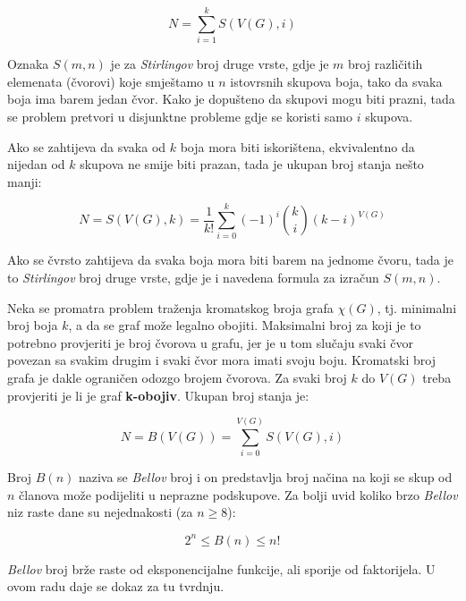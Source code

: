 \documentclass[times, utf8, diplomski, numeric]{fer}
\begin{document}
\begin{equation}
N = \sum_{i=1}^{k} S(V(G), i)
\end{equation}

Oznaka $S(m,n)$ je za \emph{Stirlingov} broj druge vrste, gdje je $m$ broj različitih elemenata (čvorovi) koje smještamo u $n$ istovrsnih skupova boja, tako da svaka boja ima barem jedan čvor. Kako je dopušteno da skupovi mogu biti prazni, tada se problem pretvori u disjunktne probleme gdje se koristi samo $i$ skupova. 

Ako se zahtijeva da svaka od $k$ boja mora biti iskorištena, ekvivalentno da nijedan od $k$ skupova ne smije biti prazan, tada je ukupan broj stanja nešto manji:

\begin{equation}
N = S(V(G), k) = \frac{1}{k!}\sum_{i=0}^{k} (-1)^i \binom{k}{i}(k-i)^{V(G)}  
\end{equation}

Ako se čvrsto zahtijeva da svaka boja mora biti barem na jednome čvoru, tada je to \emph{Stirlingov} broj druge vrste, gdje je i navedena formula za izračun $S(m,n)$.

Neka se promatra problem traženja kromatskog broja grafa $\chi(G)$, tj. minimalni broj boja $k$, a da se graf može legalno obojiti. Maksimalni broj za koji je to potrebno provjeriti je broj čvorova u grafu, jer je u tom slučaju svaki čvor povezan sa svakim drugim i svaki čvor mora imati svoju boju. Kromatski broj grafa je dakle ograničen odozgo brojem čvorova. Za svaki broj $k$ do $V(G)$ treba provjeriti je li je graf \textbf{k-obojiv}. Ukupan broj stanja je:

\begin{equation}
N = B(V(G)) = \sum_{i=0}^{V(G)} S(V(G), i)
\end{equation}

Broj $B(n)$ naziva se \emph{Bellov} broj i on predstavlja broj načina na koji se skup od $n$ članova može podijeliti u neprazne podskupove. Za bolji uvid koliko brzo \emph{Bellov} niz raste dane su nejednakosti (za $n\ge 8$): 

\begin{equation}
2^n \le B(n) \le n! 
\end{equation}

\emph{Bellov} broj brže raste od eksponencijalne funkcije, ali sporije od faktorijela. U ovom radu daje se dokaz za tu tvrdnju.
\end{document}
